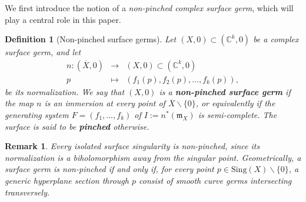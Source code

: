 \documentclass[reqno,dvipsnames,12pt]{amsart}
\renewcommand{\setminus}{\smallsetminus}
\newtheorem{rema}[thm]{Remark}
\newtheorem{propr}[thm]{Properties}
\newtheorem{defi}[thm]{Definition}
\begin{document}
We first introduce the notion of a \textit{non-pinched complex surface germ}, which will play a central role in this paper.
\begin{defi}[Non-pinched surface germs]\label{cuspidal}
Let $(X,0) \subset (\mathbb{C}^k,0)$ be a complex surface germ, and let
\[
\begin{array}{ccc}
n:(\overline{X},0) & \longrightarrow & (X,0) \subset (\mathbb{C}^k,0) \\
p & \longmapsto & (f_1(p),f_2(p),\dots,f_k(p)),
\end{array}
\]
be its normalization. We say that $(X,0)$ is a \textbf{non-pinched surface germ} if the map $n$ is an immersion at every point of $\overline{X}\setminus\{0\}$, or equivalently if the generating system $F=(f_1,\dots,f_k)$ of $I:=n^*(\mathfrak{m}_X)$ is semi-complete. The surface is said to be \textbf{pinched} otherwise.
\end{defi}
\begin{rema}
Every isolated surface singularity is non-pinched, since its normalization is a biholomorphism away from the singular point. Geometrically, a surface germ is non-pinched if and only if, for every point $p\in \mathrm{Sing}(X)\setminus\{0\}$, a generic hyperplane section through $p$ consist of smooth curve germs intersecting transversely.
\end{rema}
\end{document}

